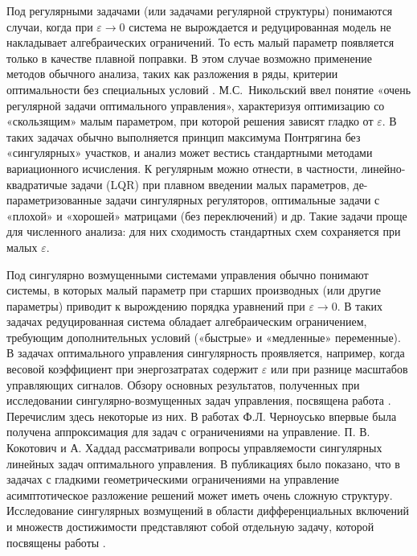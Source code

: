 \documentclass[../main.tex]{subfiles}
\begin{document}
Под регулярными задачами (или задачами регулярной структуры) понимаются случаи, когда при $\varepsilon\to0$ система не вырождается и редуцированная модель не накладывает алгебраических ограничений. 
То есть малый параметр появляется только в качестве плавной поправки. 
В этом случае возможно применение методов обычного анализа, таких как разложения в ряды, критерии оптимальности без специальных условий \cite{Haratishvili}. 
М.С. Никольский \cite{Nikolski} ввел понятие «очень регулярной задачи оптимального управления», характеризуя оптимизацию со «скользящим» малым параметром, при которой решения зависят гладко от $\varepsilon$. 
В таких задачах обычно выполняется принцип максимума Понтрягина без «сингулярных» участков, и анализ может вестись стандартными методами вариационного исчисления. 
К регулярным можно отнести, в частности, линейно-квадратичые задачи (LQR) при плавном введении малых параметров, де-параметризованные задачи сингулярных регуляторов, оптимальные задачи с «плохой» и «хорошей» матрицами (без переключений) и др. 
Такие задачи проще для численного анализа: для них сходимость стандартных схем сохраняется при малых $\varepsilon$.


Под сингулярно возмущенными системами управления обычно понимают системы, в которых малый параметр при старших производных (или другие параметры) приводит к вырождению порядка уравнений при $\varepsilon\to0$. 
В таких задачах редуцированная система обладает алгебраическим ограничением, требующим дополнительных условий («быстрые» и «медленные» переменные). 
В задачах оптимального управления сингулярность проявляется, например, когда весовой коэффициент при энергозатратах содержит $\varepsilon$ или при разнице масштабов управляющих сигналов. 
Обзору основных результатов, полученных при исследовании сингулярно-возмущенных задач управления, посвящена работа \cite{Dmitriev}.
Перечислим здесь некоторые из них. 
В работах Ф.Л. Черноусько \cite{Chernousko1968, Chernousko1977} впервые была получена аппроксимация для задач с ограничениями на управление.
П. В. Кокотович и А. Хаддад  \cite{Kokotovic} рассматривали вопросы управляемости сингулярных линейных задач оптимального управления.
В публикациях \cite{Ilyin1989, Ilyin1998} было показано, что в задачах с гладкими геометрическими ограничениями на управление  асимптотическое разложение решений может иметь очень сложную структуру. 
Исследование сингулярных возмущений в области дифференциальных включений и множеств достижимости представляют собой отдельную задачу, которой посвящены работы \cite{FilippovaKurzhansky, Veliov, GONCHAROVAOVSEEVICH}.
\end{document}
